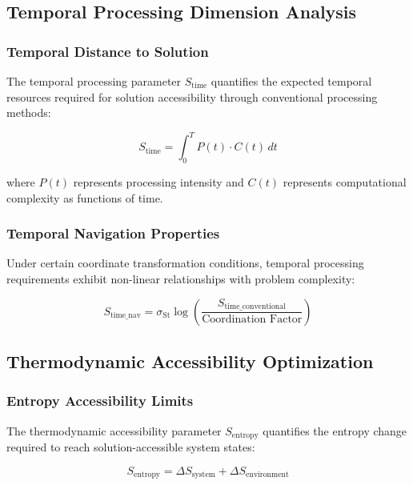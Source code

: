 \documentclass[11pt]{article}
\theoremstyle{definition}
\theoremstyle{remark}
\newcommand{\StellasConstant}{\sigma_{\text{St}}}
\begin{document}
\subsection{Temporal Processing Dimension Analysis}

\subsubsection{Temporal Distance to Solution}

The temporal processing parameter $S_{\text{time}}$ quantifies the expected temporal resources required for solution accessibility through conventional processing methods:

\begin{equation}
S_{\text{time}} = \int_0^T P(t) \cdot C(t) \, dt
\end{equation}

where $P(t)$ represents processing intensity and $C(t)$ represents computational complexity as functions of time.

\subsubsection{Temporal Navigation Properties}

Under certain coordinate transformation conditions, temporal processing requirements exhibit non-linear relationships with problem complexity:

\begin{equation}
S_{\text{time\_nav}} = \StellasConstant \log\left(\frac{S_{\text{time\_conventional}}}{\text{Coordination Factor}}\right)
\end{equation}

\subsection{Thermodynamic Accessibility Optimization}

\subsubsection{Entropy Accessibility Limits}

The thermodynamic accessibility parameter $S_{\text{entropy}}$ quantifies the entropy change required to reach solution-accessible system states:

\begin{equation}
S_{\text{entropy}} = \Delta S_{\text{system}} + \Delta S_{\text{environment}}
\end{equation}
\end{document}
